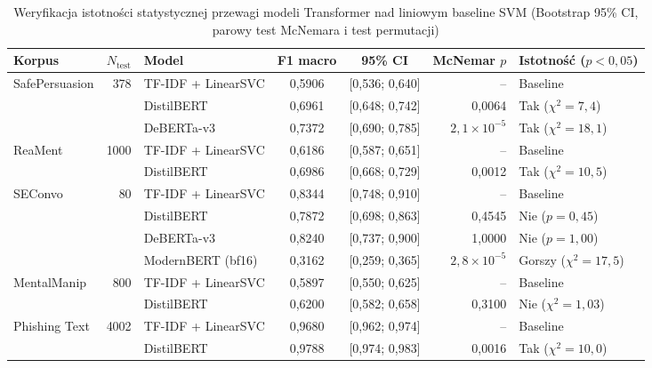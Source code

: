 \documentclass[12pt,a4paper,twoside]{report}
\begin{document}
\begin{table}[H]\centering
\footnotesize
\caption{Weryfikacja istotności statystycznej przewagi modeli Transformer nad liniowym baseline SVM (Bootstrap 95\% CI, parowy test McNemara i test permutacji)}\label{tab:statistical_significance}
\begin{tabularx}{\textwidth}{l r >{\raggedright\arraybackslash}p{2.8cm} c c r >{\centering\arraybackslash}X}\toprule
\textbf{Korpus} & \textbf{$N_{\text{test}}$} & \textbf{Model} & \textbf{F1 macro} & \textbf{95\% CI} & \textbf{McNemar $p$} & \textbf{Istotność ($p < 0,05$)} \\\midrule
\multirow{3}{*}{SafePersuasion} & \multirow{3}{*}{378} 
  & TF-IDF + LinearSVC & 0,5906 & [0,536; 0,640] & -- & Baseline \\
  & & DistilBERT & 0,6961 & [0,648; 0,742] & 0,0064 & Tak ($\chi^2 = 7,4$) \\
  & & DeBERTa-v3 & 0,7372 & [0,690; 0,785] & $2,1 \times 10^{-5}$ & Tak ($\chi^2 = 18,1$) \\\midrule
\multirow{2}{*}{ReaMent} & \multirow{2}{*}{1000} 
  & TF-IDF + LinearSVC & 0,6186 & [0,587; 0,651] & -- & Baseline \\
  & & DistilBERT & 0,6986 & [0,668; 0,729] & 0,0012 & Tak ($\chi^2 = 10,5$) \\\midrule
\multirow{4}{*}{SEConvo} & \multirow{4}{*}{80} 
  & TF-IDF + LinearSVC & 0,8344 & [0,748; 0,910] & -- & Baseline \\
  & & DistilBERT & 0,7872 & [0,698; 0,863] & 0,4545 & Nie ($p = 0,45$) \\
  & & DeBERTa-v3 & 0,8240 & [0,737; 0,900] & 1,0000 & Nie ($p = 1,00$) \\
  & & ModernBERT (bf16) & 0,3162 & [0,259; 0,365] & $2,8 \times 10^{-5}$ & Gorszy ($\chi^2 = 17,5$) \\\midrule
\multirow{2}{*}{MentalManip} & \multirow{2}{*}{800} 
  & TF-IDF + LinearSVC & 0,5897 & [0,550; 0,625] & -- & Baseline \\
  & & DistilBERT & 0,6200 & [0,582; 0,658] & 0,3100 & Nie ($\chi^2 = 1,03$) \\\midrule
\multirow{2}{*}{Phishing Text} & \multirow{2}{*}{4002} 
  & TF-IDF + LinearSVC & 0,9680 & [0,962; 0,974] & -- & Baseline \\
  & & DistilBERT & 0,9788 & [0,974; 0,983] & 0,0016 & Tak ($\chi^2 = 10,0$) \\
\bottomrule\end{tabularx}
\end{table}
\end{document}
